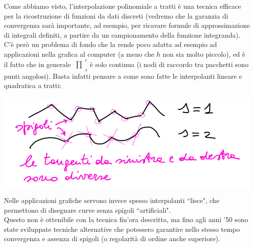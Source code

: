 \documentclass[12pt,a4paper]{article}
\newcommand{\inter}{\begin{matrix}\prod\end{matrix}}
\begin{document}


Come abbiamo visto, l'interpolazione polinomiale a tratti è una tecnica efficace per la ricostruzione di funzioni da dati discreti (vedremo che la garanzia di convergenza sarà importante, ad esempio, per ricavare formule di approssimazione di integrali definiti, a partire da un campionamento della funzione integranda).\\
C'è però un problema di fondo che la rende poco adatta ad esempio ad applicazioni nella grafica al computer (a meno che $h$ non sia molto piccolo), ed è il fatto che in generale $\inter_s^c$ è solo continua (i nodi di raccordo tra pacchetti sono punti angolosi). Basta infatti pensare a come sono fatte le interpolanti lineare e quadratica a tratti:
\begin{center}
    \includegraphics[scale=0.4]{img_pag18.png}
\end{center}
Nelle applicazioni grafiche servono invece spesso interpolanti ``lisce", che permettono di disegnare curve senza spigoli ``artificiali".\\
Questo non è ottenibile con la tecnica fin'ora descritta, ma fino agli anni '50 sono state sviluppate tecniche alternative che potessero garantire nello stesso tempo convergenza e assenza di spigoli (o regolarità di ordine anche superiore).
\end{document}
